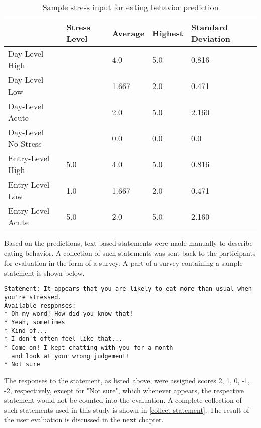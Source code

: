 \begin{table}[htpb]
  \caption[Sample Stress Input]{Sample stress input for eating behavior prediction}\label{tab:stress-sample}
  \centering
  \begin{tabular}{l l l l l}
    \toprule
      & Stress Level & Average & Highest & Standard Deviation \\
    \midrule
      Day-Level High & & 4.0 & 5.0 & 0.816 \\
      Day-Level Low & & 1.667 & 2.0 & 0.471 \\
      Day-Level Acute & & 2.0 & 5.0 & 2.160 \\
      Day-Level No-Stress & & 0.0 & 0.0 & 0.0 \\
      Entry-Level High & 5.0 & 4.0 & 5.0 & 0.816 \\
      Entry-Level Low & 1.0 & 1.667 & 2.0 & 0.471 \\
      Entry-Level Acute & 5.0 & 2.0 & 5.0 & 2.160 \\
    \bottomrule
  \end{tabular}
\end{table}

Based on the predictions, text-based statements were made manually to describe eating behavior. A collection of such statements was sent back to the participants for evaluation in the form of a survey. A part of a survey containing a sample statement is shown below.

\begin{lstlisting}
Statement: It appears that you are likely to eat more than usual when
you're stressed.
Available responses:
* Oh my word! How did you know that!
* Yeah, sometimes
* Kind of...
* I don't often feel like that...
* Come on! I kept chatting with you for a month
  and look at your wrong judgement!
* Not sure
\end{lstlisting}

\bigskip
The responses to the statement, as listed above, were assigned scores 2, 1, 0, -1, -2, respectively, except for "Not sure", which whenever appears, the respective statement would not be counted into the evaluation. A complete collection of such statements used in this study is shown in \autoref{collect-statement}. The result of the user evaluation is discussed in the next chapter.
